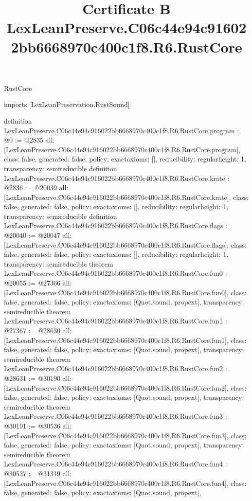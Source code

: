 \begin{lexlean}{RustCore}
\title{Certificate B LexLeanPreserve.C06c44e94c916022bb6668970c400c1f8.R6.RustCore}
\begin{coremodule}
imports [LexLeanPreservation.RustSound]

definition LexLeanPreserve.C06c44e94c916022bb6668970c400c1f8.R6.RustCore.program : @0 := @2835 {
  all: [LexLeanPreserve.C06c44e94c916022bb6668970c400c1f8.R6.RustCore.program],
  class: false,
  generated: false,
  policy: exact{axioms: []},
  reducibility: regular{height: 1},
  transparency: semireducible
}
definition LexLeanPreserve.C06c44e94c916022bb6668970c400c1f8.R6.RustCore.krate : @2836 := @20039 {
  all: [LexLeanPreserve.C06c44e94c916022bb6668970c400c1f8.R6.RustCore.krate],
  class: false,
  generated: false,
  policy: exact{axioms: []},
  reducibility: regular{height: 1},
  transparency: semireducible
}
definition LexLeanPreserve.C06c44e94c916022bb6668970c400c1f8.R6.RustCore.flags : @20040 := @20047 {
  all: [LexLeanPreserve.C06c44e94c916022bb6668970c400c1f8.R6.RustCore.flags],
  class: false,
  generated: false,
  policy: exact{axioms: []},
  reducibility: regular{height: 1},
  transparency: semireducible
}
theorem LexLeanPreserve.C06c44e94c916022bb6668970c400c1f8.R6.RustCore.fun0 : @20055 := @27366 {
  all: [LexLeanPreserve.C06c44e94c916022bb6668970c400c1f8.R6.RustCore.fun0],
  class: false,
  generated: false,
  policy: exact{axioms: [Quot.sound, propext]},
  transparency: semireducible
}
theorem LexLeanPreserve.C06c44e94c916022bb6668970c400c1f8.R6.RustCore.fun1 : @27367 := @28630 {
  all: [LexLeanPreserve.C06c44e94c916022bb6668970c400c1f8.R6.RustCore.fun1],
  class: false,
  generated: false,
  policy: exact{axioms: [Quot.sound, propext]},
  transparency: semireducible
}
theorem LexLeanPreserve.C06c44e94c916022bb6668970c400c1f8.R6.RustCore.fun2 : @28631 := @30190 {
  all: [LexLeanPreserve.C06c44e94c916022bb6668970c400c1f8.R6.RustCore.fun2],
  class: false,
  generated: false,
  policy: exact{axioms: [Quot.sound, propext]},
  transparency: semireducible
}
theorem LexLeanPreserve.C06c44e94c916022bb6668970c400c1f8.R6.RustCore.fun3 : @30191 := @30536 {
  all: [LexLeanPreserve.C06c44e94c916022bb6668970c400c1f8.R6.RustCore.fun3],
  class: false,
  generated: false,
  policy: exact{axioms: [Quot.sound, propext]},
  transparency: semireducible
}
theorem LexLeanPreserve.C06c44e94c916022bb6668970c400c1f8.R6.RustCore.fun4 : @30537 := @31319 {
  all: [LexLeanPreserve.C06c44e94c916022bb6668970c400c1f8.R6.RustCore.fun4],
  class: false,
  generated: false,
  policy: exact{axioms: [Quot.sound, propext]},
}
\end{coremodule}
\end{lexlean}
